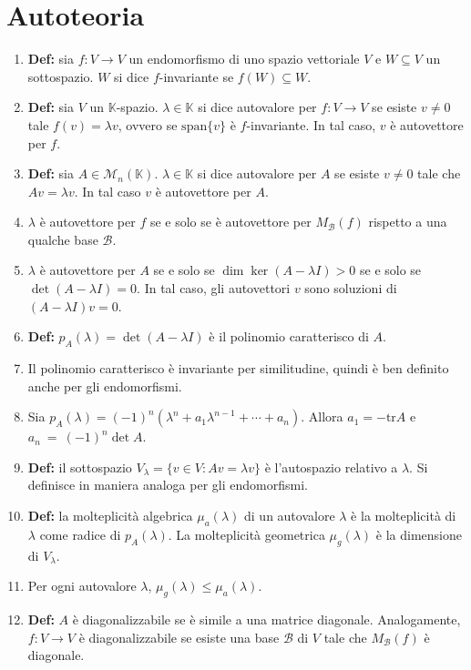 \documentclass[a4paper,11pt]{article}
\begin{document}
\section{Autoteoria}
\begin{enumerate}[resume]
	\item \textbf{Def:} sia $f\colon V\to V$ un endomorfismo di uno spazio vettoriale $V$ e $W\subseteq V$ un sottospazio. $W$ si dice $f$-invariante se $f(W)\subseteq W$.
	\item \textbf{Def:} sia $V$ un $\mathbb{K}$-spazio. $\lambda \in\mathbb{K}$ si dice autovalore per $f\colon V\to V$ se esiste $v\neq 0$ tale $f(v)=\lambda v$, ovvero se $\textrm{span}\{v\}$ è $f$-invariante. In tal caso, $v$ è autovettore per $f$.
	\item \textbf{Def:} sia $A\in\mathcal{M}_n(\mathbb{K})$. $\lambda\in\mathbb{K}$ si dice autovalore per $A$ se esiste $v\neq0$ tale che $Av=\lambda v$. In tal caso $v$ è autovettore per $A$.
	\item $\lambda$ è autovettore per $f$ se e solo se è autovettore per $M_{\mathcal{B}}(f)$ rispetto a una qualche base $\mathcal{B}$.
	\item $\lambda$ è autovettore per $A$ se e solo se $\dim\ker(A-\lambda I)>0$ se e solo se $\det(A-\lambda I)=0$. In tal caso, gli autovettori $v$ sono soluzioni di $(A-\lambda I)v=0$.
	\item \textbf{Def:} $p_A(\lambda)=\det(A-\lambda I)$ è il polinomio caratterisco di $A$.
	\item Il polinomio caratterisco è invariante per similitudine, quindi è ben definito anche per gli endomorfismi.
	\item Sia $p_A(\lambda)=(-1)^n\left(\lambda^n+a_1\lambda^{n-1}+\cdots+a_n\right)$. Allora $a_1=-\textrm{tr}A$ e $a_n~=~(-1)^n\det A$.
	\item \textbf{Def:} il sottospazio $V_\lambda=\{v\in V:Av=\lambda v\}$ è l'autospazio relativo a $\lambda$. Si definisce in maniera analoga per gli endomorfismi.
	\item \textbf{Def:} la molteplicità algebrica $\mu_a(\lambda)$ di un autovalore $\lambda$ è la molteplicità di $\lambda$ come radice di $p_A(\lambda)$. La molteplicità geometrica $\mu_g(\lambda)$ è la dimensione di $V_\lambda$.
	\item Per ogni autovalore $\lambda$, $\mu_g(\lambda)\leq\mu_a(\lambda)$.
	\item \textbf{Def:} $A$ è diagonalizzabile se è simile a una matrice diagonale. Analogamente, $f\colon V\to V$ è diagonalizzabile se esiste una base $\mathcal{B}$ di $V$ tale che $M_\mathcal{B}(f)$ è diagonale.

\end{enumerate}
\end{document}

